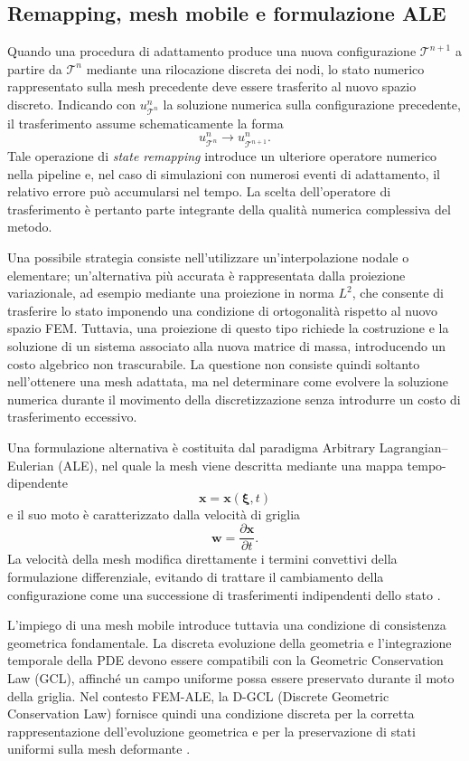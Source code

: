 \subsection{Remapping, mesh mobile e formulazione ALE}

Quando una procedura di adattamento produce una nuova configurazione $\mathcal{T}^{n+1}$ a partire da $\mathcal{T}^{n}$ mediante una rilocazione discreta dei nodi, lo stato numerico rappresentato sulla mesh precedente deve essere trasferito al nuovo spazio discreto. Indicando con $u^n_{\mathcal{T}^n}$ la soluzione numerica sulla configurazione precedente, il trasferimento assume schematicamente la forma
\[
u^n_{\mathcal{T}^n}
\longrightarrow
u^n_{\mathcal{T}^{n+1}}.
\]
Tale operazione di \textit{state remapping} introduce un ulteriore operatore numerico nella pipeline e, nel caso di simulazioni con numerosi eventi di adattamento, il relativo errore può accumularsi nel tempo. La scelta dell'operatore di trasferimento è pertanto parte integrante della qualità numerica complessiva del metodo.

Una possibile strategia consiste nell'utilizzare un'interpolazione nodale o elementare; un'alternativa più accurata è rappresentata dalla proiezione variazionale, ad esempio mediante una proiezione in norma $L^2$, che consente di trasferire lo stato imponendo una condizione di ortogonalità rispetto al nuovo spazio FEM. Tuttavia, una proiezione di questo tipo richiede la costruzione e la soluzione di un sistema associato alla nuova matrice di massa, introducendo un costo algebrico non trascurabile. La questione non consiste quindi soltanto nell'ottenere una mesh adattata, ma nel determinare come evolvere la soluzione numerica durante il movimento della discretizzazione senza introdurre un costo di trasferimento eccessivo.

Una formulazione alternativa è costituita dal paradigma Arbitrary Lagrangian--Eulerian (ALE), nel quale la mesh viene descritta mediante una mappa tempo-dipendente
\[
\mathbf{x}=\mathbf{x}(\boldsymbol{\xi},t)
\]
e il suo moto è caratterizzato dalla velocità di griglia
\[
\mathbf{w}=\frac{\partial \mathbf{x}}{\partial t}.
\]
La velocità della mesh modifica direttamente i termini convettivi della formulazione differenziale, evitando di trattare il cambiamento della configurazione come una successione di trasferimenti indipendenti dello stato \citep{hirt1974an,donea2004arbitrary}.

L'impiego di una mesh mobile introduce tuttavia una condizione di consistenza geometrica fondamentale. La discreta evoluzione della geometria e l'integrazione temporale della PDE devono essere compatibili con la Geometric Conservation Law (GCL), affinché un campo uniforme possa essere preservato durante il moto della griglia. Nel contesto FEM-ALE, la D-GCL (Discrete Geometric Conservation Law) fornisce quindi una condizione discreta per la corretta rappresentazione dell'evoluzione geometrica e per la preservazione di stati uniformi sulla mesh deformante \citep{farhat2001the,formaggia2004stability}.

